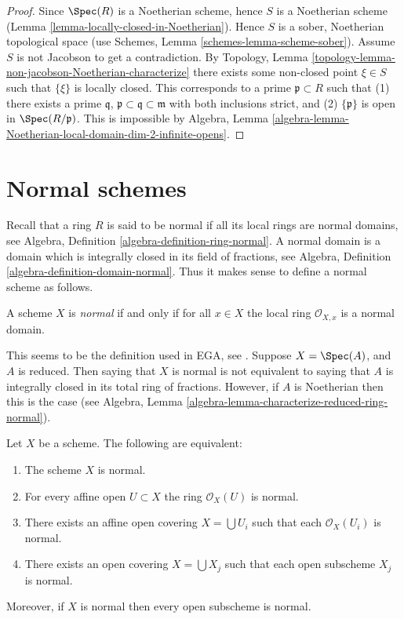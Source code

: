 \begin{proof}
Since $\Spec(R)$ is a Noetherian scheme, hence
$S$ is a Noetherian scheme (Lemma \ref{lemma-locally-closed-in-Noetherian}).
Hence $S$ is a sober, Noetherian topological space (use
Schemes, Lemma \ref{schemes-lemma-scheme-sober}).
Assume $S$ is not Jacobson to
get a contradiction. By
Topology, Lemma \ref{topology-lemma-non-jacobson-Noetherian-characterize}
there exists some non-closed point $\xi \in S$
such that $\{\xi\}$ is locally closed. This corresponds
to a prime $\mathfrak p \subset R$ such that (1) there exists
a prime $\mathfrak q$, $\mathfrak p \subset \mathfrak q \subset \mathfrak m$
with both inclusions strict, and (2) $\{\mathfrak p\}$ is open in
$\Spec(R/\mathfrak p)$. This is impossible by Algebra,
Lemma \ref{algebra-lemma-Noetherian-local-domain-dim-2-infinite-opens}.
\end{proof}







\section{Normal schemes}
\label{section-normal}

\noindent
Recall that a ring $R$ is said to be normal if all its local rings
are normal domains,
see Algebra, Definition \ref{algebra-definition-ring-normal}.
A normal domain is a domain which is integrally closed in its field
of fractions, see
Algebra, Definition \ref{algebra-definition-domain-normal}.
Thus it makes sense to define a normal scheme as follows.

\begin{definition}
\label{definition-normal}
A scheme $X$ is {\it normal} if and only if for all $x \in X$ the local ring
$\mathcal{O}_{X, x}$ is a normal domain.
\end{definition}

\noindent
This seems to be the definition used in EGA, see \cite[0, 4.1.4]{EGA}.
Suppose $X = \Spec(A)$, and $A$ is reduced. Then saying that $X$ is
normal is not equivalent to saying that $A$ is integrally closed in its
total ring of fractions. However, if $A$ is Noetherian then this is the case
(see Algebra, Lemma \ref{algebra-lemma-characterize-reduced-ring-normal}).

\begin{lemma}
\label{lemma-locally-normal}
Let $X$ be a scheme. The following are equivalent:
\begin{enumerate}
\item The scheme $X$ is normal.
\item For every affine open $U \subset X$ the ring $\mathcal{O}_X(U)$
is normal.
\item There exists an affine open covering $X = \bigcup U_i$ such that
each $\mathcal{O}_X(U_i)$ is normal.
\item There exists an open covering $X = \bigcup X_j$
such that each open subscheme $X_j$ is normal.
\end{enumerate}
Moreover, if $X$ is normal then every open subscheme
is normal.
\end{lemma}

